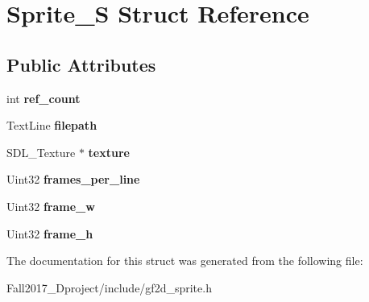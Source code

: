 \hypertarget{struct_sprite___s}{}\section{Sprite\+\_\+S Struct Reference}
\label{struct_sprite___s}
\subsection*{Public Attributes}
\begin{DoxyCompactItemize}
\item 
\mbox{\label{struct_sprite___s_aa5a88046bcc7714d5552fad27f9ddfa1}} 
int {\bfseries ref\+\_\+count}
\item 
\mbox{\label{struct_sprite___s_a61aa0c0bd5d119fe799df23d224ff020}} 
Text\+Line {\bfseries filepath}
\item 
\mbox{\label{struct_sprite___s_a5d32fb7438741c3db79917b049ef7c6d}} 
S\+D\+L\+\_\+\+Texture $\ast$ {\bfseries texture}
\item 
\mbox{\label{struct_sprite___s_ae22965665b11b18ace378fd464b7c834}} 
Uint32 {\bfseries frames\+\_\+per\+\_\+line}
\item 
\mbox{\label{struct_sprite___s_a33329fae94eca18e5055a947e3bdd4bd}} 
Uint32 {\bfseries frame\+\_\+w}
\item 
\mbox{\label{struct_sprite___s_aa17793009ae8c625cf9186ccba6b2e2c}} 
Uint32 {\bfseries frame\+\_\+h}
\end{DoxyCompactItemize}


The documentation for this struct was generated from the following file\+:\begin{DoxyCompactItemize}
\item 
Fall2017\+\_\+Dproject/include/gf2d\+\_\+sprite.\+h\end{DoxyCompactItemize}
